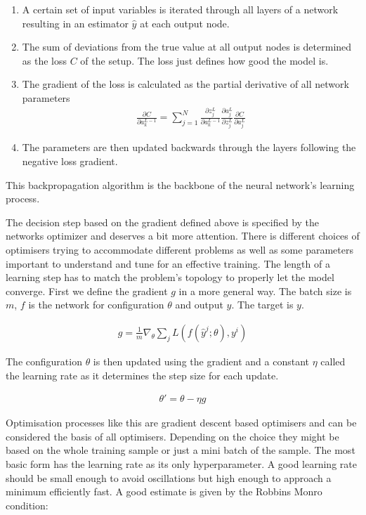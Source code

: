 \begin{enumerate}
    \item A certain set of input variables is iterated through all layers of a network resulting in an estimator $\hat{y}$ at each output node.
    \item The sum of deviations from the true value at all output nodes is determined as the loss $C$ of the setup. The loss just defines how good the model is.
    \item The gradient of the loss is calculated as the partial derivative of all network parameters
    \begin{align*}
        \frac{\partial C}{\partial a_k^{L-1}} = \sum_{j=1}^N \frac{\partial z_j^L}{\partial a_k^{L-1}} \frac{\partial a_j^L}{\partial z_j^L}\frac{\partial C}{\partial a_j^L}
    \end{align*}
    \item The parameters are then updated backwards through the layers following the negative loss gradient.
\end{enumerate}

This backpropagation algorithm is the backbone of the neural network's learning process.

The decision step based on the gradient defined above is specified by the networks optimizer and deserves a bit more attention. There is different choices of optimisers trying to accommodate different problems as well as some parameters important to understand and tune for an effective training. The length of a learning step has to match the problem's topology to properly let the model converge. First we define the gradient $g$ in a more general way. The batch size is $m$, $f$ is the network for configuration $\theta$ and output $\hat{y}$. The target is $y$.

\begin{align}
    g = \frac{1}{m} \nabla_{\theta} \sum_j L(f(\hat{y}^j; \theta), y^i)
\end{align}

The configuration $\theta$ is then updated using the gradient and a constant $\eta$ called the learning rate as it determines the step size for each update.

\begin{align}
    \theta \prime = \theta - \eta g
\end{align}

Optimisation processes like this are gradient descent based optimisers and can be considered the basis of all optimisers. Depending on the choice they might be based on the whole training sample or just a mini batch of the sample. The most basic form has the learning rate as its only hyperparameter. A good learning rate should be small enough to avoid oscillations but high enough to approach a minimum efficiently fast. A good estimate is given by the Robbins Monro condition:

